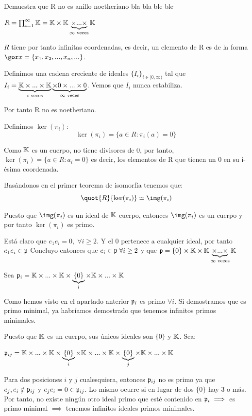 \begin{problem}[2]
	\ppart Demuestra que R no es anillo noetheriano
	\ppart bla bla
	\ppart ble ble
	\solution

	\spart
	$R=  \prod_{i=1}^{\infty} \mathbb{K} = \mathbb{K} \times \mathbb{K} \underbrace{\times... \times}_{\infty \text{ veces}} \mathbb{K}$

	$R$ tiene por tanto infinitas coordenadas, es decir, un elemento de R es de la forma $\cls{x}=\{x_1,x_2,...,x_n,...\}$.

	Definimos una cadena creciente de ideales $\{I_i\}_{i \in [0,\infty)}$ tal que $I_i = \underbrace{\mathbb{K} \times... \times \mathbb{K}}_{i\text{ veces}} \underbrace{\times 0 \times ...  \times 0}_{\infty \text{ veces}}$. Vemos que $I_i$ nunca estabiliza.

	Por tanto R no es noetheriano.


	\spart

	Definimos $\ker(\pi_i)$:
	$$ \ker(\pi_i)=\{ a \in R: \pi_i(a)=0 \} $$

	Como $\mathbb{K}$ es un cuerpo, no tiene divisores de 0, por tanto, $\ker(\pi_i) = \{ a \in R: a_i=0 \}$ es decir, los elementos de R que tienen un 0 en su i-ésima coordenada.

	Basándonos en el primer teorema de isomorfía tenemos que:
	$$\quot{R}{\ker(\pi_i)} \simeq \img(\pi_i)$$


	Puesto que  $\img(\pi_i)$ es un ideal de $\mathbb{K}$ cuerpo, entonces $\img(\pi_i)$ es un cuerpo y por tanto $\ker(\pi_i)$ es primo.

	\spart

	Está claro que $e_1e_i = 0, \; \forall i \geq 2$. Y el 0 pertenece a cualquier ideal, por tanto $e_1e_i \in \mathfrak{p}$ Concluyo entonces que $e_i \in \mathfrak{p} \; \forall i \geq 2$ y que $\mathfrak{p} = \{0\} \times \mathbb{K} \times \mathbb{K} \underbrace{\times... \times}_{\infty \text{ veces}} \mathbb{K}$

	\spart

	Sea $\mathfrak{p}_i =  \mathbb{K} \times ... \times \mathbb{K} \times \underbrace{\{0\}}_{i} \times \mathbb{K} \times ... \times \mathbb{K}$

	Como hemos visto en el apartado anterior $\mathfrak{p}_i$ es primo $\forall i$. Si demostramos que es primo minimal, ya habríamos demostrado que tenemos infinitos primos minimales.

	Puesto que $\mathbb{K}$ es un cuerpo, sus únicos ideales son $\{0\}$ y $\mathbb{K}$. Sea:

	$\mathfrak{p}_{ij} =  \mathbb{K} \times ... \times \mathbb{K} \times \underbrace{\{0\}}_{i} \times \mathbb{K} \times ... \times \mathbb{K} \times \underbrace{\{0\}}_{j} \times \mathbb{K} \times ... \times \mathbb{K}$

	Para dos posiciones $i$ y $j$ cualesquiera, entonces $\mathfrak{p}_{ij}$ no es primo ya que $e_j, e_i \notin \mathfrak{p}_{ij}$ y $e_je_i=0 \in \mathfrak{p}_{ij}$. Lo mismo ocurre si en lugar de dos $\{0\}$ hay 3 o más. Por tanto, no existe ningún otro ideal primo que esté contenido en $\mathfrak{p}_i \implies$ es primo minimal $\implies$ tenemos infinitos ideales primos minimales.
\end{problem}

